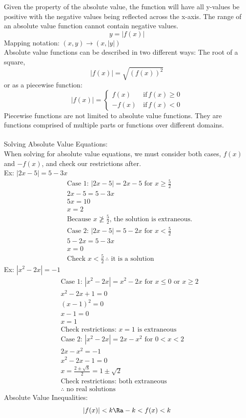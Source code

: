 Given the property of the absolute value, the function will have all y-values be positive with the negative values being reflected across the x-axis. The range of an absolute value function cannot contain negative values.
$$y=|f(x)|$$
Mapping notation: $(x,y)\rightarrow(x,|y|)$\\
Absolute value functions can be described in two different ways: The root of a square, $$|f(x)|=\sqrt{(f(x))^2}$$
or as a piecewise function:
$$|f(x)|=\left\{\begin{matrix} f(x)\,&\mathrm{if}\,f(x)\geq 0\\ -f(x)\,&\mathrm{if}\,f(x)<0\end{matrix}\right.$$
Piecewise functions are not limited to absolute value functions. They are functions comprised of multiple parts or functions over different domains.\\
\\
Solving Absolute Value Equations:\\
When solving for absolute value equations, we must consider both cases, $f(x)$ and $-f(x)$, and check our restrictions after.\\
Ex: $|2x-5|=5-3x$
\begin{align*}
    &\text{Case 1: } |2x-5|=2x-5\text{ for }x\geq\frac{5}{2}\\
    &2x-5=5-3x\\
    &5x=10\\
    &x=2\\
    &\text{Because }x\ngeq\frac{5}{2}\text{, the solution is extraneous.}\\
    &\text{Case 2: } |2x-5|=5-2x\text{ for }x<\frac{5}{2}\\
    &5-2x=5-3x\\
    &x=0\\
    &\text{Check }x<\frac{5}{2}\,\therefore\text{ it is a solution}
\end{align*}
Ex: $|x^2-2x|=-1$
\begin{align*}
    &\text{Case 1: }|x^2-2x|=x^2-2x\text{ for }x\leq 0\text{ or }x\geq 2\\
    &x^2-2x+1=0\\
    &(x-1)^2=0\\
    &x-1=0\\
    &x=1\\
    &\text{Check restrictions: }x=1\text{ is extraneous}\\
    &\text{Case 2: }|x^2-2x|=2x-x^2\text{ for }0<x<2\\
    &2x-x^2=-1\\
    &x^2-2x-1=0\\
    &x=\frac{2\pm\sqrt{8}}{2}=1\pm\sqrt{2}\\
    &\text{Check restrictions: both extraneous}\\
    &\therefore\text{ no real solutions}
\end{align*}
Absolute Value Inequalities:\\
$$|f(x)|<k\Ra-k<f(x)<k$$
